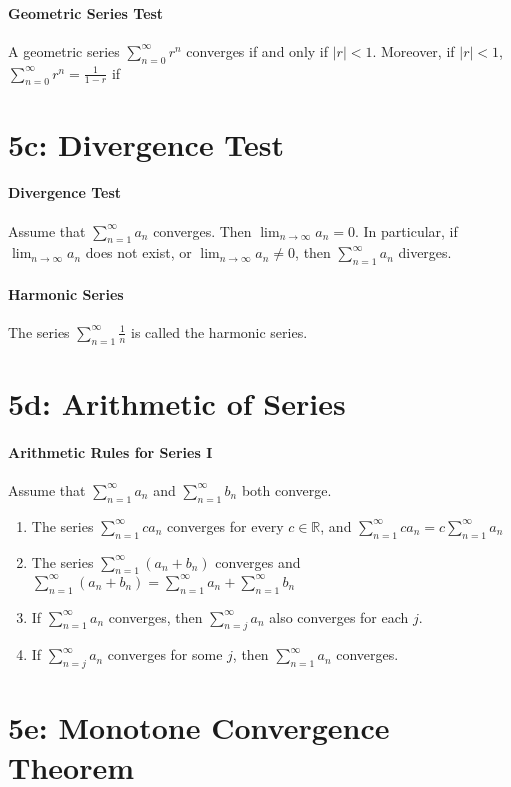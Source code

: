 \documentclass[10pt,letter]{article}
\begin{document}
\paragraph{Geometric Series Test}
A geometric series $\sum_{n=0}^\infty r^n$ converges if and only if $|r|<1$. Moreover, if $|r|<1$, $\sum_{n=0}^\infty r^n=\frac{1}{1-r}$ if 

\section*{5c: Divergence Test}
\paragraph{Divergence Test}
Assume that $\sum_{n=1}^\infty a_n$ converges. Then $\lim_{n\rightarrow\infty}a_n=0$. In particular, if $\lim_{n\rightarrow\infty}a_n$ does not exist, or $\lim_{n\rightarrow\infty}a_n\neq0$, then $\sum_{n=1}^\infty a_n$ diverges. 
\paragraph{Harmonic Series}
The series $\sum_{n=1}^\infty \frac{1}{n}$ is called the harmonic series.


\section*{5d: Arithmetic of Series}
\paragraph{Arithmetic Rules for Series I}
Assume that $\sum_{n=1}^\infty a_n$ and $\sum_{n=1}^\infty b_n$ both converge. 
\begin{enumerate}
    \item The series $\sum_{n=1}^\infty ca_n$ converges for every $c\in\mathbb{R}$, and $\sum_{n=1}^\infty ca_n=c\sum_{n=1}^\infty a_n$ 
    \item The series $\sum_{n=1}^\infty(a_n+b_n)$ converges and $\sum_{n=1}^\infty(a_n+b_n)=\sum_{n=1}^\infty a_n+\sum_{n=1}^\infty b_n$ 
    \item If $\sum_{n=1}^\infty a_n$ converges, then $\sum_{n=j}^\infty a_n$ also converges for each $j$.
    \item If $\sum_{n=j}^\infty a_n$ converges for some $j$, then $\sum_{n=1}^\infty a_n$ converges. 
\end{enumerate}


\section*{5e: Monotone Convergence Theorem}
\end{document}
